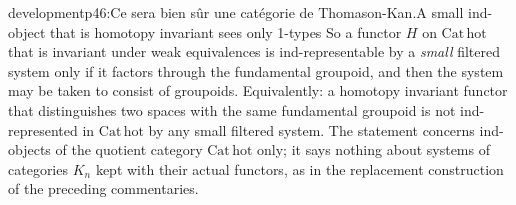 \begin{dcomment}{development}{p46:Ce sera bien sûr une catégorie de Thomason-Kan.}{A small ind-object that is homotopy invariant sees only 1-types}
So a functor $H$ on $\mathrm{Cat}\,\mathrm{hot}$ that is invariant under weak equivalences is ind-representable by a \emph{small} filtered system only if it factors through the fundamental groupoid, and then the system may be taken to consist of groupoids. Equivalently: a homotopy invariant functor that distinguishes two spaces with the same fundamental groupoid is not ind-represented in $\mathrm{Cat}\,\mathrm{hot}$ by any small filtered system. The statement concerns ind-objects of the quotient category $\mathrm{Cat}\,\mathrm{hot}$ only; it says nothing about systems of categories $K_n$ kept with their actual functors, as in the replacement construction of the preceding commentaries.
\end{dcomment}

